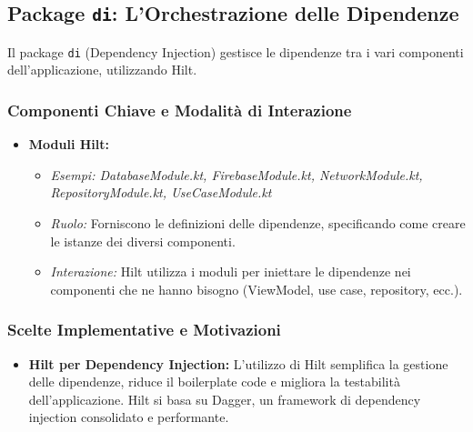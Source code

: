 \subsection{Package \texttt{di}: L'Orchestrazione delle
Dipendenze}\label{subsec:package-texttt{di}:-l'orchestrazione-delle-dipendenze}

Il package \texttt{di} (Dependency Injection) gestisce le dipendenze tra i vari
componenti dell'applicazione, utilizzando Hilt.

\subsubsection{Componenti Chiave e Modalità di Interazione}

\begin{itemize}
    \item \textbf{Moduli Hilt:}
    \begin{itemize}
        \item \textit{Esempi: DatabaseModule.kt, FirebaseModule.kt,
        NetworkModule.kt, RepositoryModule.kt, UseCaseModule.kt}
        \item \textit{Ruolo:} Forniscono le definizioni delle dipendenze,
        specificando come creare le istanze dei diversi componenti.
        \item \textit{Interazione:} Hilt utilizza i moduli per iniettare le
        dipendenze nei componenti che ne hanno bisogno (ViewModel, use case,
        repository, ecc.).
    \end{itemize}
\end{itemize}

\subsubsection{Scelte Implementative e Motivazioni}

\begin{itemize}
    \item \textbf{Hilt per Dependency Injection:} L'utilizzo di Hilt semplifica
    la gestione delle dipendenze, riduce il boilerplate code e migliora la
    testabilità dell'applicazione.
    Hilt si basa su Dagger, un framework di
    dependency injection consolidato e performante.
\end{itemize}